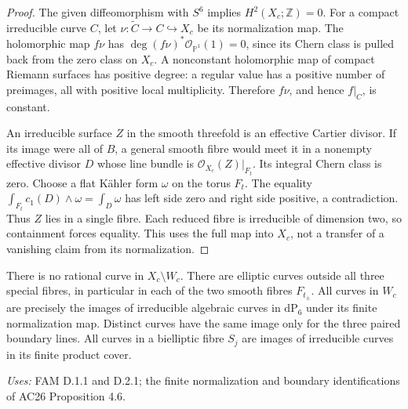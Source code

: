 \begin{proof}
The given diffeomorphism with \(S^6\) implies \(H^2(X_c;\mathbb Z)=0\).
For a compact irreducible curve \(C\), let
\(\nu:\widetilde C\to C\hookrightarrow X_c\) be its normalization map.
The holomorphic map \(f\nu\) has
\(\deg (f\nu)^*\mathcal O_{\mathbb P^1}(1)=0\), since its Chern class is
pulled back from the zero class on \(X_c\). A nonconstant holomorphic map
of compact Riemann surfaces has positive degree: a regular value has a
positive number of preimages, all with positive local multiplicity.
Therefore \(f\nu\), and hence \(f|_C\), is constant.

An irreducible surface \(Z\) in the smooth threefold is an effective
Cartier divisor. If its image were all of \(B\), a general smooth fibre
would meet it in a nonempty effective divisor \(D\) whose line bundle
is \(\mathcal O_{X_c}(Z)|_{F_t}\). Its integral Chern class is zero.
Choose a flat K\"ahler form \(\omega\) on the torus \(F_t\). The equality
\(\int_{F_t}c_1(D)\wedge\omega=\int_D\omega\) has left side zero and right
side positive, a contradiction. Thus \(Z\) lies in a single fibre.
Each reduced fibre is irreducible of dimension two, so containment forces
equality. This uses the full map into \(X_c\), not a transfer of a
vanishing claim from its normalization.
\end{proof}

\begin{proposition}[FAM D.2.2; T]\label{fam:D.2.2}
There is no rational curve in \(X_c\setminus W_c\). There are elliptic
curves outside all three special fibres, in particular in each of the
two smooth fibres \(F_{t_\pm}\). All curves in \(W_c\) are precisely the
images of irreducible algebraic curves in \(\mathrm{dP}_6\) under its
finite normalization map. Distinct curves have the same image only for
the three paired boundary lines. All curves in a bielliptic fibre
\(S_j\) are images of irreducible curves in its finite product cover.
\end{proposition}
\noindent\emph{Uses:} FAM D.1.1 and D.2.1; the finite normalization and boundary identifications of AC26 Proposition 4.6.\par

